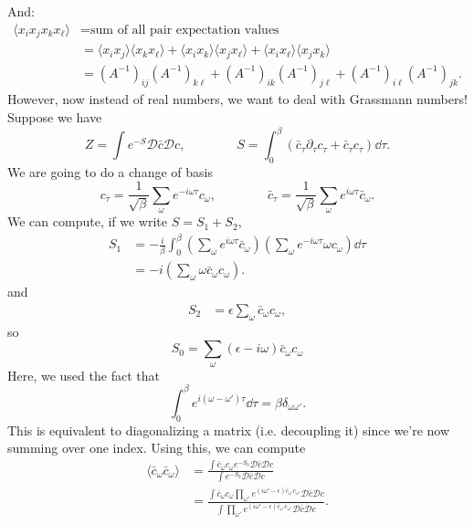 \documentclass{article}
\numberwithin{equation}{section}
\begin{document}
And:
\begin{align}
    \langle x_ix_jx_kx_{\ell}\rangle &= \text{sum of all pair expectation values} \\ 
    &= \langle x_ix_j\rangle \langle x_kx_\ell\rangle + \langle x_i x_k \rangle \langle x_jx_\ell \rangle + \langle x_ix_\ell \rangle \langle x_jx_k\rangle \\ 
    &= (A^{-1})_{ij}(A^{-1})_{k\ell} + (A^{-1})_{ik}(A^{-1})_{j\ell} + (A^{-1})_{i\ell}(A^{-1})_{jk}.
\end{align}
However, now instead of real numbers, we want to deal with Grassmann numbers! Suppose we have 
\begin{equation}
    Z = \int e^{-S} \mathcal{D}\bar{c}\mathcal{D}c,\quad\quad\quad\quad S = \int_0^\beta (\bar{c}_\tau \partial_\tau c_\tau + \bar{c}_\tau c_\tau) \dd{\tau}.
\end{equation}
We are going to do a change of basis 
\begin{equation}
    c_{\tau} = \frac{1}{\sqrt{\beta}} \sum_\omega e^{-i\omega\tau} c_\omega,\quad\quad\quad\quad \bar{c}_\tau = \frac{1}{\sqrt{\beta}} \sum_\omega e^{i\omega\tau} \bar{c}_\omega.
\end{equation}
We can compute, if we write $S=S_1+S_2,$
\begin{align}
    S_1 &= -\frac{i}{\beta} \int_0^\beta \left(\sum_\omega  e^{i\omega\tau} \bar{c}_\omega\right)\left(\sum_\omega e^{-i\omega\tau}\omega c_\omega\right)  \dd{\tau} \\ 
    &=-i \left(\sum_\omega \omega \bar{c}_\omega c_\omega\right).
\end{align}
and 
\begin{align}
    S_2 &= \epsilon \sum_\omega \bar{c}_\omega c_{\omega},
\end{align}
so 
\begin{equation}
    S_0 =  \sum_\omega (\epsilon - i\omega) \bar{c}_\omega c_\omega
\end{equation}
Here, we used the fact that 
\begin{equation}
    \int_0^\beta e^{i(\omega-\omega')\tau}\dd{\tau} = \beta\delta_{\omega\omega'}.
\end{equation}
This is equivalent to diagonalizing a matrix (i.e. decoupling it) since we're now summing over one index. Using this, we can compute 
\begin{align}
    \langle \bar{c}_\omega \bar{c}_\omega\rangle &= \frac{\int \bar{c}_\omega c_\omega e^{-S_0} \mathcal{D}\bar{c}\mathcal{D}c}{\int e^{-S_0} \mathcal{D}\bar{c}\mathcal{D}c} \\
    &= \frac{\int \bar{c}_\omega c_\omega \prod_{\omega'} e^{(i\omega'-\epsilon)\bar{c}_{\omega'}c_{\omega'}}\mathcal{D}\bar{c}\mathcal{D}c}{\int \prod_{\omega'} e^{(i\omega'-\epsilon)\bar{c}_{\omega'}c_{\omega'}} \mathcal{D}\bar{c}\mathcal{D}c}.
\end{align}
\end{document}
